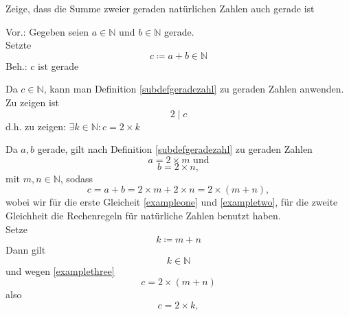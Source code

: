 \documentclass[a4paper, markcase = upper, parskip = true, fleqn]{scrartcl}
\begin{document}
\begin{exercisebox}
	Zeige, dass die Summe zweier geraden natürlichen Zahlen auch gerade ist\par
	Vor.: Gegeben seien $ a \in \mathbb{N} $ und $ b \in \mathbb{N} $ gerade.\\
	Setzte
	\[ c \coloneqq a + b \in \mathbb{N} \]
	Beh.: $c$ ist gerade\\
	\begin{proofbox}
		Da $ c \in \mathbb{N} $, kann man Definition \ref{subdefgeradezahl} zu geraden Zahlen anwenden. Zu zeigen ist
		\[ 2 \mid c \]
		d.h. zu zeigen: $ \exists k \in \mathbb{N} : c = 2 \times k $\par
		Da $a, b$ gerade, gilt nach Definition \ref{subdefgeradezahl} zu geraden Zahlen
		\begin{equation}
			\label{exampleone}
			a = 2 \times m \text{ und}
		\end{equation}
		\begin{equation}
			\label{exampletwo}
			b = 2 \times n,
		\end{equation}
		mit $ m, n \in \mathbb{N} $, sodass
		\begin{equation}
			\label{examplethree}
			c = a + b = 2 \times m + 2 \times n = 2 \times ( m + n ),
		\end{equation}
		wobei wir für die erste Gleicheit \ref{exampleone} und \ref{exampletwo}, für die zweite Gleichheit die Rechenregeln für natürliche Zahlen benutzt haben.\\
		Setze
		\[ k \coloneqq m + n \]
		Dann gilt
		\[ k \in \mathbb{N} \]
		und wegen \ref{examplethree}
		\[ c = 2 \times ( m + n ) \]
		also
		\[
			c = 2 \times k, \tag*{$\square$}
		\]
	\end{proofbox}
\end{exercisebox}
\end{document}
